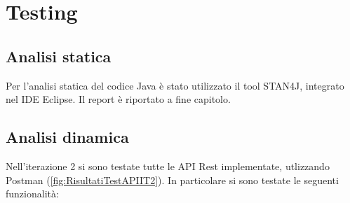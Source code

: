 \section{Testing}
\subsection{Analisi statica}
Per l'analisi statica del codice Java è stato utilizzato il tool STAN4J, integrato nel IDE Eclipse. Il report è riportato a fine capitolo.

\subsection{Analisi dinamica}
Nell'iterazione 2 si sono testate tutte le API Rest implementate, utlizzando Postman (\Fig \ref{fig:RisultatiTestAPIIT2}). In particolare si sono testate le seguenti funzionalità:


